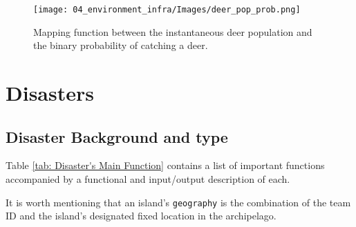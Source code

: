 \begin{figure}[!htb]
    \centering
    \texttt{[image: 04\_environment\_infra/Images/deer\_pop\_prob.png]}
    \caption{Mapping function between the instantaneous deer population and the binary probability of catching a deer.}
    \label{fig:Foraging Mapping}
\end{figure}



\newpage
\section{Disasters}
\subsection{Disaster Background and type}

Table \ref{tab: Disaster's Main Function} contains a list of important functions accompanied by a functional and input/output description of each.

It is worth mentioning that an island's \texttt{geography} is the combination of the team ID and the island’s designated fixed location in the archipelago.

